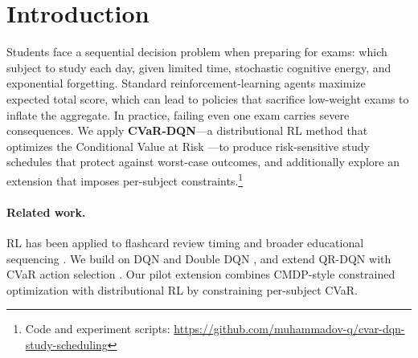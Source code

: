 \documentclass[a4paper,11pt]{article}
\theoremstyle{definition}
\begin{document}
\begin{abstract}
We address optimal exam study scheduling using reinforcement learning. A student must allocate limited study days across multiple subjects, balancing knowledge acquisition against forgetting, energy constraints, and subject dependencies. Standard DQN maximizes expected total score but may sacrifice individual exams. We apply \textbf{CVaR-DQN}, a distributional RL method that optimizes the Conditional Value at Risk, to produce risk-sensitive schedules that protect against worst-case outcomes. We evaluate seven methods across three environment configurations: CVaR-DQN consistently improves CVaR$_{10\%}$ over DQN while sacrificing a small amount of mean return, exactly the trade-off the algorithm is designed to make. Ablation studies show energy stochasticity is the primary source of outcome variance, and removing it eliminates the mean--risk gap entirely. As a pilot, we explore \emph{Subject-Constrained CVaR-DQN}---a Multi-Objective Distributional Constrained MDP with per-subject CVaR constraints---which reduces Physics failure on Medium from 30\% to 8\% but underperforms on aggregate metrics and under distribution shift, motivating adaptive thresholding as future work.
\end{abstract}

\section{Introduction}
\label{sec:intro}

Students face a sequential decision problem when preparing for exams: which subject to study each day, given limited time, stochastic cognitive energy, and exponential forgetting. Standard reinforcement-learning agents maximize expected total score, which can lead to policies that sacrifice low-weight exams to inflate the aggregate. In practice, failing even one exam carries severe consequences. We apply \textbf{CVaR-DQN}---a distributional RL method that optimizes the Conditional Value at Risk \citep{chow2015,dabney2018}---to produce risk-sensitive study schedules that protect against worst-case outcomes, and additionally explore an extension that imposes per-subject constraints.\footnote{Code and experiment scripts: \url{https://github.com/muhammadov-q/cvar-dqn-study-scheduling}}

\paragraph{Related work.} RL has been applied to flashcard review timing \citep{reddy2017} and broader educational sequencing \citep{doroudi2019}. We build on DQN \citep{mnih2015} and Double DQN \citep{vanhasselt2016}, and extend QR-DQN \citep{dabney2018} with CVaR action selection \citep{chow2015}. Our pilot extension combines CMDP-style constrained optimization \citep{altman1999,achiam2017} with distributional RL by constraining per-subject CVaR.
\end{document}
